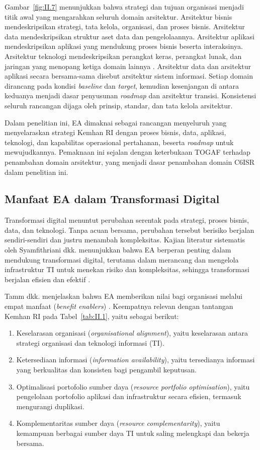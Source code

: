 Gambar~\ref{fig:II.7} menunjukkan bahwa strategi dan tujuan organisasi menjadi titik awal yang mengarahkan seluruh domain arsitektur. Arsitektur bisnis mendeskripsikan strategi, tata kelola, organisasi, dan proses bisnis. Arsitektur data mendeskripsikan struktur aset data dan pengelolaannya. Arsitektur aplikasi mendeskripsikan aplikasi yang mendukung proses bisnis beserta interaksinya. Arsitektur teknologi mendeskripsikan perangkat keras, perangkat lunak, dan jaringan yang menopang ketiga domain lainnya \cite{TOGAF2022}. Arsitektur data dan arsitektur aplikasi secara bersama-sama disebut arsitektur sistem informasi. Setiap domain dirancang pada kondisi \textit{baseline} dan \textit{target}, kemudian kesenjangan di antara keduanya menjadi dasar penyusunan \textit{roadmap} dan arsitektur transisi. Konsistensi seluruh rancangan dijaga oleh prinsip, standar, dan tata kelola arsitektur.

Dalam penelitian ini, EA dimaknai sebagai rancangan menyeluruh yang menyelaraskan strategi Kemhan RI dengan proses bisnis, data, aplikasi, teknologi, dan kapabilitas operasional pertahanan, beserta \textit{roadmap} untuk mewujudkannya. Pemaknaan ini sejalan dengan keterbukaan TOGAF terhadap penambahan domain arsitektur, yang menjadi dasar penambahan domain C6ISR dalam penelitian ini.

\subsection{Manfaat EA dalam Transformasi Digital}
\label{sec:II.3.1}

Transformasi digital menuntut perubahan serentak pada strategi, proses bisnis, data, dan teknologi. Tanpa acuan bersama, perubahan tersebut berisiko berjalan sendiri-sendiri dan justru menambah kompleksitas. Kajian literatur sistematis oleh Syamfithriani dkk. menunjukkan bahwa EA berperan penting dalam mendukung transformasi digital, terutama dalam merancang dan mengelola infrastruktur TI untuk menekan risiko dan kompleksitas, sehingga transformasi berjalan efisien dan efektif \cite{Syamfithriani2024}.

Tamm dkk. menjelaskan bahwa EA memberikan nilai bagi organisasi melalui empat manfaat (\textit{benefit enablers}) \cite{Tamm2011}. Keempatnya relevan dengan tantangan Kemhan RI pada Tabel~\ref{tab:II.1}, yaitu sebagai berikut:
\begin{enumerate}[label=\arabic*.]
\item Keselarasan organisasi (\textit{organisational alignment}), yaitu keselarasan antara strategi organisasi dan teknologi informasi (TI).
\item Ketersediaan informasi (\textit{information availability}), yaitu tersedianya informasi yang berkualitas dan konsisten bagi pengambil keputusan.
\item Optimalisasi portofolio sumber daya (\textit{resource portfolio optimisation}), yaitu pengelolaan portofolio aplikasi dan infrastruktur secara efisien, termasuk mengurangi duplikasi.
\item Komplementaritas sumber daya (\textit{resource complementarity}), yaitu kemampuan berbagai sumber daya TI untuk saling melengkapi dan bekerja bersama.
\end{enumerate}

